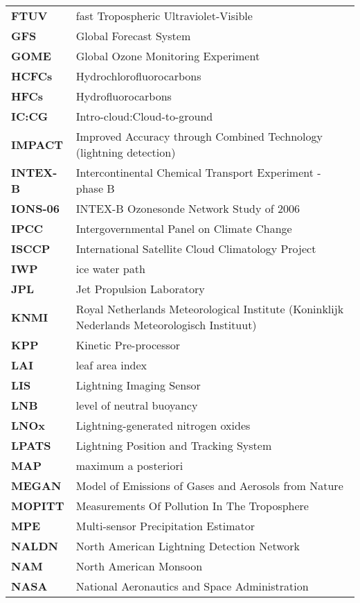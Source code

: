 \begin{longtable}{p{1.5in}p{5.5in}}
\textbf{FTUV} & fast Tropospheric Ultraviolet-Visible\\
\textbf{GFS} & Global Forecast System\\
\textbf{GOME} & Global Ozone Monitoring Experiment\\
\textbf{HCFCs} & Hydrochlorofluorocarbons\\
\textbf{HFCs} & Hydrofluorocarbons\\
\textbf{IC:CG} & Intro-cloud:Cloud-to-ground\\
\textbf{IMPACT} & Improved Accuracy through Combined Technology (lightning detection)\\
\textbf{INTEX-B} & Intercontinental Chemical Transport Experiment - phase B\\
\textbf{IONS-06} & INTEX-B Ozonesonde Network Study of 2006\\
\textbf{IPCC} & Intergovernmental Panel on Climate Change\\
\textbf{ISCCP} & International Satellite Cloud Climatology Project\\
\textbf{IWP} & ice water path\\
\textbf{JPL} & Jet Propulsion Laboratory\\
\textbf{KNMI} & Royal Netherlands Meteorological Institute \newline (Koninklijk Nederlands Meteorologisch Instituut)\\
\textbf{KPP} & Kinetic Pre-processor\\
\textbf{LAI} & leaf area index\\
\textbf{LIS} & Lightning Imaging Sensor\\
\textbf{LNB} & level of neutral buoyancy\\
\textbf{LNOx} & Lightning-generated nitrogen oxides\\
\textbf{LPATS} & Lightning Position and Tracking System\\
\textbf{MAP} & maximum a posteriori\\
\textbf{MEGAN} & Model of Emissions of Gases and Aerosols from Nature\\
\textbf{MOPITT} & Measurements Of Pollution In The Troposphere\\
\textbf{MPE} & Multi-sensor Precipitation Estimator\\
\textbf{NALDN} & North American Lightning Detection Network\\
\textbf{NAM} & North American Monsoon\\
\textbf{NASA} & National Aeronautics and Space Administration\\

\end{longtable}
